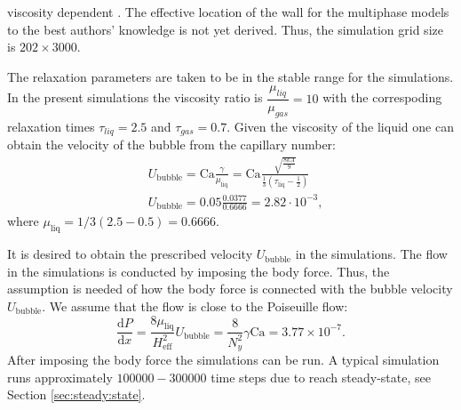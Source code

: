 \documentclass[preprint,12pt]{elsarticle}
\newcommand{\Ca}{\mathrm{Ca}}
\begin{document}
{\begin{description}
viscosity dependent \cite{ginzburg-multireflection}.  The effective location of the
wall for the
multiphase models to the best authors' knowledge is not yet derived. Thus, the simulation grid size
is $202\times 3000$. 
 \item[Velocity] The relaxation parameters are taken to be in the stable range for the simulations.
In the present simulations the viscosity ratio is $\dfrac{\mu_{liq}}{\mu_{gas}}=10$ with the
correspoding relaxation times $\tau_{liq}=2.5$ and $\tau_{gas}=0.7$. Given the viscosity of the
liquid one can obtain the velocity of the bubble from the capillary number: 
\begin{equation}
\begin{aligned}
&U_{\mathrm{bubble}}=\Ca \frac{\gamma}{\mu_{\mathrm{liq}}}=\Ca \frac{\sqrt{\frac{8 k
A}{9}}}{\frac{1}{3}(\tau_{\mathrm{liq}}-\frac{1}{2})}\\
&U_{\mathrm{bubble}}=0.05 \frac{0.0377}{0.6666}=2.82 \cdot10^{-3},
\end{aligned}
\end{equation}
where $\mu_{\mathrm{liq}}=1/3 (2.5-0.5)=0.6666$.
\item[Body force] 
It is desired to obtain the prescribed velocity $U_{\mathrm{bubble}}$ in the simulations. The
flow in the simulations is conducted by imposing the body force. Thus, the assumption is needed of
how the body force is connected with the bubble velocity $U_{\mathrm{bubble}}$. We assume that the
flow is close to the Poiseuille flow:
\begin{equation}
\frac{\mathrm{d}P}{\mathrm{d}x}=\frac{8\mu_{\mathrm{liq}}}{H_{\mathrm{eff}}^2}
U_{\mathrm{bubble}}=\frac{8}{N_y^2}\gamma \Ca=3.77\times 10^{-7}.  
\end{equation}
After imposing the body force the simulations can be run. A typical simulation runs approximately
$100000-300000$ time steps due to reach steady-state, see Section \ref{sec:steady:state}.
\end{description}
}
\end{document}
